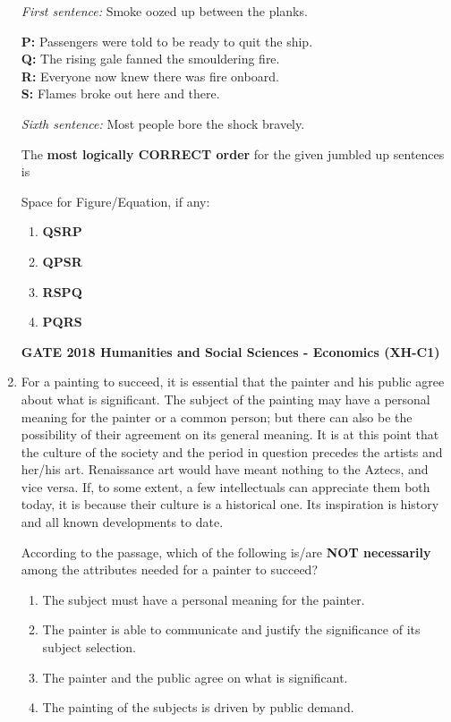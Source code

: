 \documentclass[journal,12pt,onecolumn]{exam}
\theoremstyle{remark}
\begin{document}
\begin{enumerate}
\textit{First sentence:} Smoke oozed up between the planks.

\textbf{P:} Passengers were told to be ready to quit the ship.\\
\textbf{Q:} The rising gale fanned the smouldering fire.\\
\textbf{R:} Everyone now knew there was fire onboard.\\
\textbf{S:} Flames broke out here and there.

\textit{Sixth sentence:} Most people bore the shock bravely.

The \textbf{most logically CORRECT order} for the given jumbled up sentences is

\vspace{0.2cm}
Space for Figure/Equation, if any:
\begin{enumerate}
  \item \textbf{QSRP}
  \item \textbf{QPSR}
  \item \textbf{RSPQ}
  \item \textbf{PQRS}
\end{enumerate}
\textbf{GATE 2018 Humanities and Social Sciences - Economics (XH-C1)}
 \item For a painting to succeed, it is essential that the painter and his public agree about what is significant. The subject of the painting may have a personal meaning for the painter or a common person; but there can also be the possibility of their agreement on its general meaning. It is at this point that the culture of the society and the period in question precedes the artists and her/his art. Renaissance art would have meant nothing to the Aztecs, and vice versa. If, to some extent, a few intellectuals can appreciate them both today, it is because their culture is a historical one. Its inspiration is history and all known developments to date.

According to the passage, which of the following is/are \textbf{NOT necessarily} among the attributes needed for a painter to succeed?

\vspace{0.2cm}

\begin{enumerate}
  \item The subject must have a personal meaning for the painter.
  \item The painter is able to communicate and justify the significance of its subject selection.
  \item The painter and the public agree on what is significant.
  \item The painting of the subjects is driven by public demand.
\end{enumerate}


\end{enumerate}
\end{document}
